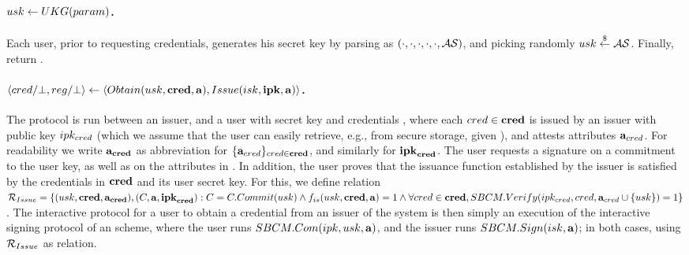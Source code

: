\paragraph{$usk \gets UKG(param)$.} %
Each user, prior to requesting credentials, generates his secret key by parsing
\parm as $(\cdot,\cdot,\cdot,\cdot,\cdot,\mathcal{AS})$, and picking randomly
$usk \stackrel{\$}{\gets} \mathcal{AS}$. Finally, return \usk.

\paragraph{$\langle cred/\bot,reg/\bot \rangle \gets
  \langle Obtain(usk,\mathbf{cred},\mathbf{a}),Issue(isk,\mathbf{ipk},\mathbf{a})\rangle$.} %
The protocol is run between an issuer, and a user with secret key \usk and
credentials \scred, where each $cred \in \mathbf{cred}$ is issued by an issuer with
public key $ipk_{cred}$ (which we assume that the user can easily retrieve,
e.g., from secure storage, given \cred), and attests attributes
$\mathbf{a}_{cred}$. For readability we write $\mathbf{a}_{\mathbf{cred}}$ as abbreviation for
$\lbrace \mathbf{a}_{cred} \rbrace_{cred \in \mathbf{cred}}$, and similarly for
$\mathbf{ipk}_{\mathbf{cred}}$. The user requests a signature on a commitment to the user key,
as well as on the attributes in \attrs. In addition, the user proves that the
issuance function \fissue established by the issuer is satisfied by the
credentials in $\mathbf{cred}$
and its user secret key. For this, we define relation $\mathcal{R}_{Issue} = \lbrace
(usk,\mathbf{cred},\mathbf{a}_{\mathbf{cred}}), (C,\mathbf{a},\mathbf{ipk}_{\mathbf{cred}}): C = C.Commit(usk) \land
f_{is}(usk,\mathbf{cred},\mathbf{a}) = 1 \land \forall cred \in \mathbf{cred},
SBCM.Verify(ipk_{cred},cred,
\mathbf{a}_{cred} \cup \lbrace usk \rbrace) = 1 \rbrace$. The interactive protocol
for a user to obtain a credential from an issuer of the system is then simply an
execution of the interactive signing protocol of an \SBCM scheme, where the user
runs $SBCM.Com(ipk,usk,\mathbf{a})$, and the issuer runs $SBCM.Sign(isk,\mathbf{a})$;
in both cases, using $\mathcal{R}_{Issue}$ as \NIZK relation.

\iffalse
\begin{itemize}
\item \uline{User}: Commit to the user secret key with $\Ccom \gets
  \CCommit(\usk)$. Compute proof $\NIZKproof \gets
  \NIZKProve^{\NIZKRel_{\Issue}}(\NIZKcrs_{\Issue},(\usk,\scred,\attrs_{\scred}),
  (\Ccom,\attrs,\sipk_{\scred}))$. Send $(\Ccom,\NIZKproof)$ to Issuer.
\item \uline{Issuer}: Verify \NIZKproof with $\NIZKVerify^{\NIZKRel_{\Issue}}
  (\NIZKcrs_{\Issue},\NIZKproof,(\Ccom,\attrs,\sipk))$, and abort if it fails. Then,
  compute the credential by running $\cred \gets \SBCMSign(\SBCMsk,\Ccom,
  \attrs)$. Send \cred to User. Output $\utrans \gets (\Ccom,\attrs,\sipk,
  \cred,\NIZKproof)$.
\item \uline{User}: Verify the credential with $\SBCMVerify(\SBCMvk,\cred,
  \attrs \cup \lbrace \usk \rbrace)$. Reject if verification fails.
  Otherwise, return \cred.
\end{itemize}
\fi

